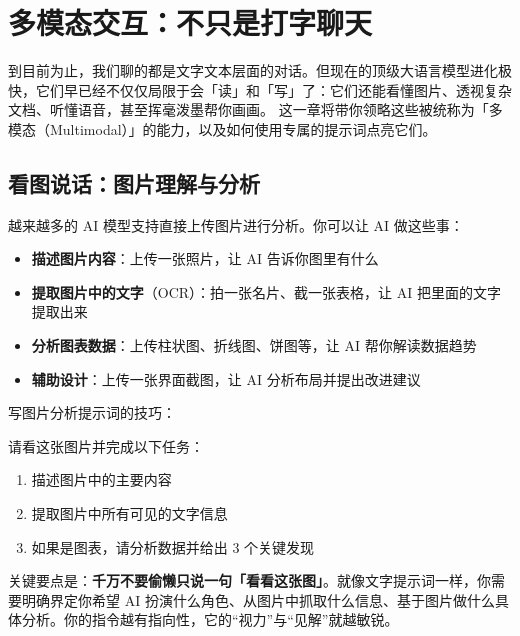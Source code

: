 % 
% 


\chapter{多模态交互：不只是打字聊天}
\label{ch:multimodal}

到目前为止，我们聊的都是文字文本层面的对话。但现在的顶级大语言模型进化极快，它们早已经不仅仅局限于会「读」和「写」了：它们还能看懂图片、透视复杂文档、听懂语音，甚至挥毫泼墨帮你画画。
这一章将带你领略这些被统称为「多模态（Multimodal）」的能力，以及如何使用专属的提示词点亮它们。

\section{看图说话：图片理解与分析}

越来越多的 AI 模型支持直接上传图片进行分析。你可以让 AI 做这些事：

\begin{itemize}
  \item \textbf{描述图片内容}：上传一张照片，让 AI 告诉你图里有什么
  \item \textbf{提取图片中的文字}（OCR）：拍一张名片、截一张表格，让 AI 把里面的文字提取出来
  \item \textbf{分析图表数据}：上传柱状图、折线图、饼图等，让 AI 帮你解读数据趋势
  \item \textbf{辅助设计}：上传一张界面截图，让 AI 分析布局并提出改进建议
\end{itemize}

写图片分析提示词的技巧：

\begin{promptbox}
请看这张图片并完成以下任务：
\begin{enumerate}
  \item 描述图片中的主要内容
  \item 提取图片中所有可见的文字信息
  \item 如果是图表，请分析数据并给出 3 个关键发现
\end{enumerate}
\end{promptbox}

关键要点是：\textbf{千万不要偷懒只说一句「看看这张图」}。就像文字提示词一样，你需要明确界定你希望 AI 扮演什么角色、从图片中抓取什么信息、基于图片做什么具体分析。你的指令越有指向性，它的“视力”与“见解”就越敏锐。


